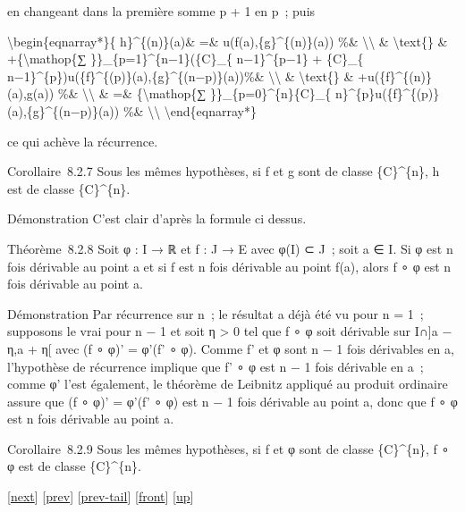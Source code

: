\documentclass[]{article}
\begin{document}
en changeant dans la première somme p + 1 en p~; puis

\textbackslash{}begin\{eqnarray*\}\{ h\}\^{}\{(n)\}(a)\& =\&
u(f(a),\{g\}\^{}\{(n)\}(a)) \%\& \textbackslash{}\textbackslash{} \&
\textbackslash{}text\{\} \& +\{\textbackslash{}mathop\{∑
\}\}\_\{p=1\}\^{}\{n−1\}(\{C\}\_\{ n−1\}\^{}\{p−1\} + \{C\}\_\{
n−1\}\^{}\{p\})u(\{f\}\^{}\{(p)\}(a),\{g\}\^{}\{(n−p)\}(a))\%\&
\textbackslash{}\textbackslash{} \& \textbackslash{}text\{\} \&
+u(\{f\}\^{}\{(n)\}(a),g(a)) \%\& \textbackslash{}\textbackslash{} \&
=\& \{\textbackslash{}mathop\{∑ \}\}\_\{p=0\}\^{}\{n\}\{C\}\_\{
n\}\^{}\{p\}u(\{f\}\^{}\{(p)\}(a),\{g\}\^{}\{(n−p)\}(a)) \%\&
\textbackslash{}\textbackslash{} \textbackslash{}end\{eqnarray*\}

ce qui achève la récurrence.

Corollaire~8.2.7 Sous les mêmes hypothèses, si f et g sont de classe
\{C\}\^{}\{n\}, h est de classe \{C\}\^{}\{n\}.

Démonstration C'est clair d'après la formule ci dessus.

Théorème~8.2.8 Soit φ : I → ℝ et f : J → E avec φ(I) ⊂ J~; soit a ∈ I.
Si φ est n fois dérivable au point a et si f est n fois dérivable au
point f(a), alors f ∘ φ est n fois dérivable au point a.

Démonstration Par récurrence sur n~; le résultat a déjà été vu pour n =
1~; supposons le vrai pour n − 1 et soit η \textgreater{} 0 tel que f ∘
φ soit dérivable sur I∩{]}a − η,a + η{[} avec (f ∘ φ)' = φ'(f' ∘ φ).
Comme f' et φ sont n − 1 fois dérivables en a, l'hypothèse de récurrence
implique que f' ∘ φ est n − 1 fois dérivable en a~; comme φ' l'est
également, le théorème de Leibnitz appliqué au produit ordinaire assure
que (f ∘ φ)' = φ'(f' ∘ φ) est n − 1 fois dérivable au point a, donc que
f ∘ φ est n fois dérivable au point a.

Corollaire~8.2.9 Sous les mêmes hypothèses, si f et φ sont de classe
\{C\}\^{}\{n\}, f ∘ φ est de classe \{C\}\^{}\{n\}.

{[}\href{coursse46.html}{next}{]} {[}\href{coursse44.html}{prev}{]}
{[}\href{coursse44.html\#tailcoursse44.html}{prev-tail}{]}
{[}\href{coursse45.html}{front}{]}
{[}\href{coursch9.html\#coursse45.html}{up}{]}
\end{document}
